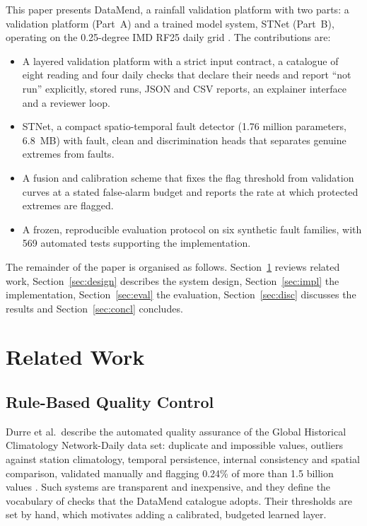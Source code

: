 \documentclass[conference,a4paper]{IEEEtran}
\begin{document}
This paper presents DataMend, a rainfall validation platform with two parts: a validation platform (Part~A) and a trained model system, STNet (Part~B), operating on the 0.25-degree IMD RF25 daily grid \cite{pai2014}. The contributions are:
\begin{itemize}
\item A layered validation platform with a strict input contract, a catalogue of eight reading and four daily checks that declare their needs and report ``not run'' explicitly, stored runs, JSON and CSV reports, an explainer interface and a reviewer loop.
\item STNet, a compact spatio-temporal fault detector (1.76 million parameters, 6.8~MB) with fault, clean and discrimination heads that separates genuine extremes from faults.
\item A fusion and calibration scheme that fixes the flag threshold from validation curves at a stated false-alarm budget and reports the rate at which protected extremes are flagged.
\item A frozen, reproducible evaluation protocol on six synthetic fault families, with 569 automated tests supporting the implementation.
\end{itemize}
The remainder of the paper is organised as follows. Section~\ref{sec:related} reviews related work, Section~\ref{sec:design} describes the system design, Section~\ref{sec:impl} the implementation, Section~\ref{sec:eval} the evaluation, Section~\ref{sec:disc} discusses the results and Section~\ref{sec:concl} concludes.

\section{Related Work}\label{sec:related}
\subsection{Rule-Based Quality Control}
Durre et al.\ describe the automated quality assurance of the Global Historical Climatology Network-Daily data set: duplicate and impossible values, outliers against station climatology, temporal persistence, internal consistency and spatial comparison, validated manually and flagging 0.24\% of more than 1.5 billion values \cite{durre2010}. Such systems are transparent and inexpensive, and they define the vocabulary of checks that the DataMend catalogue adopts. Their thresholds are set by hand, which motivates adding a calibrated, budgeted learned layer.
\end{document}
